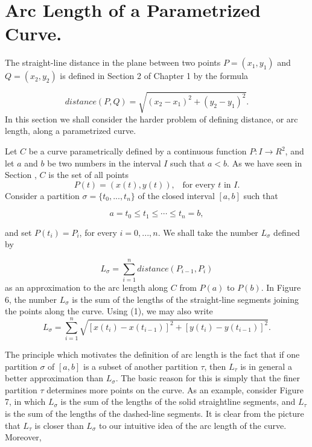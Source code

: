 \section{Arc Length of a Parametrized Curve.} The straight-line distance in the plane between two points $P = (x_1, y_1)$ and $Q = (x_2, y_2)$ is defined in Section 2 of Chapter 1 by the formula


\begin{equation}
distance(P, Q) = \sqrt{(x_2 - x_1)^2 + (y_2 - y_1)^2}   .
\label{eq10.2.1}
\end{equation}
\noindent In this section we shall consider the harder problem of defining distance, or arc length, along a parametrized curve.

Let $C$ be a curve parametrically defined by a continuous function $P: I \rightarrow R^2$, and let $a$ and $b$ be two numbers in the interval $I$ such that $a < b$. As we have seen in Section , $C$ is the set of all points
$$
P(t) = (x(t), y(t)), \;\;\;\mbox{for every $t$ in $I$.}
$$
\noindent Consider a partition $\sigma = \{ t_0, . . . , t_n \}$ of the closed interval $[a, b]$ such that 

$$
a = t_0 \leq t_1 \leq \cdots \leq t_n = b,
$$

\noindent and set $P(t_i) = P_i$, for every $i = 0, . . ., n$. We shall take the number $L_\sigma$ defined by

\begin{equation}
L_\sigma = \sum_{i=1}^n distance (P_{i-1}, P_i) 
\label{eq10.2.2}
\end{equation}
\noindent as an approximation to the arc length along $C$ from $P(a)$ to $P(b)$. In Figure 6, the number $L_\sigma$ is the sum of the lengths of the straight-line segments joining the points along the curve. Using (1), we may also write  
$$
L_\sigma = \sum_{i=1}^n \sqrt{[x(t_i) - x(t_{i-1})]^2 + [y(t_i) - y(t_{i-1})]^2} .
$$
\setcounter{figure}{5}

The principle which motivates the definition of arc length is the fact that if one partition $\sigma$ of $[a, b]$ is a subset of another partition $\tau$, then $L_\tau$ is in general a better approximation than $L_\sigma$. The basic reason for this is simply that the finer partition $\tau$ determines more points on the curve. As an example, consider Figure 7, in which $L_\sigma$ is the sum of the lengths of the solid straightline segments, and $L_\tau$ is the sum of the lengths of the dashed-line segments. It is clear from the picture that $L_\tau$ is closer than $L_\sigma$ to our intuitive idea of the arc length of the curve. Moreover,

